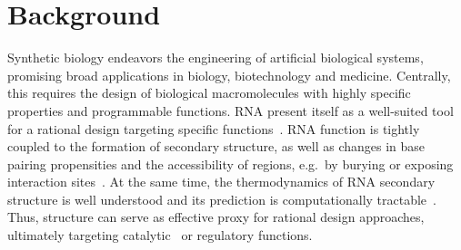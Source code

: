 \documentclass{bmcart}
\newcommand{\parHead}[1]{\Final{\paragraph{#1}}}
\newcommand{\Final}[1]{\begingroup\color{red!70!black}#1\endgroup}
\renewcommand{\Final}[1]{}
\newcommand{\citep}[1]{\cite{#1}}
\begin{document}


\section*{Background}
\parHead{Design, applications and motivation for multiple design.}Synthetic biology endeavors the engineering of artificial biological
systems, promising broad applications in biology, biotechnology and
medicine. Centrally, this requires the design of biological
macromolecules with highly specific properties and programmable functions.
RNA present itself as a well-suited tool for a
rational design targeting specific functions~\citep{Kushwaha2016}. RNA function is tightly
coupled to the formation of secondary structure, as well as changes in
base pairing propensities and the accessibility of regions, e.g.\ by
burying or exposing interaction sites~\citep{Rodrigo2014}. At the same time, the
thermodynamics of RNA secondary structure is well understood and its prediction is
computationally tractable~\citep{McCaskill1990}. Thus,  structure can serve as effective
proxy for rational design approaches, ultimately targeting catalytic~\citep{Zhang2013} or regulatory functions.
\end{document}
